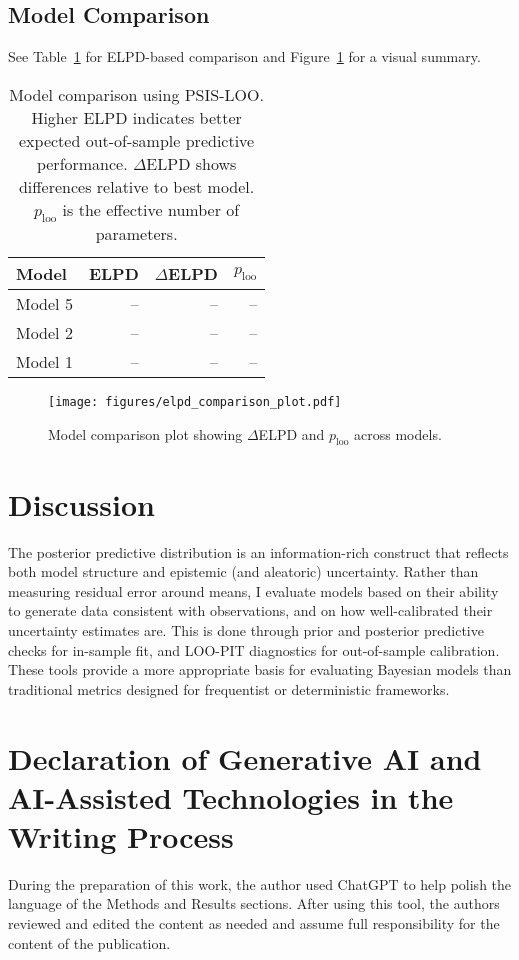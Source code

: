 \documentclass[preprint,authoryear]{elsarticle}
\begin{document}
\subsection{Model Comparison}

See Table~\ref{tab:model-comparison} for ELPD-based comparison and Figure~\ref{fig:model-comparison-plot} for a visual summary.


\begin{table}[H]
\centering
\caption{Model comparison using PSIS-LOO. Higher ELPD indicates better expected out-of-sample predictive performance. $\Delta$ELPD shows differences relative to best model. $p_{\text{loo}}$ is the effective number of parameters.}
\label{tab:model-comparison}
\begin{tabular}{lrrr}
\toprule
Model & ELPD & $\Delta$ELPD & $p_{\text{loo}}$ \\
\midrule
Model 5 & -- & -- & -- \\
Model 2 & -- & -- & -- \\
Model 1 & -- & -- & -- \\
\bottomrule
\end{tabular}
\end{table}

\begin{figure}[H]
\centering
\texttt{[image: figures/elpd\_comparison\_plot.pdf]}
\caption{Model comparison plot showing $\Delta$ELPD and $p_{\text{loo}}$ across models.}
\label{fig:model-comparison-plot}
\end{figure}


\section{Discussion}
The posterior predictive distribution is an information-rich construct that reflects both model structure and epistemic (and aleatoric) uncertainty. Rather than measuring residual error around means, I evaluate models based on their ability to generate data consistent with observations, and on how well-calibrated their uncertainty estimates are. This is done through prior and posterior predictive checks for in-sample fit, and LOO-PIT diagnostics for out-of-sample calibration. These tools provide a more appropriate basis for evaluating Bayesian models than traditional metrics designed for frequentist or deterministic frameworks.

\section*{Declaration of Generative AI and AI-Assisted Technologies in the Writing Process}
During the preparation of this work, the author used ChatGPT to help polish the language of the Methods and Results sections. After using this tool, the authors reviewed and edited the content as needed and assume full responsibility for the content of the publication.



\end{document}
